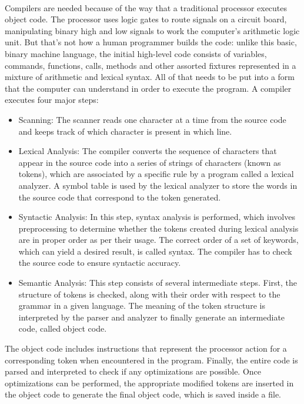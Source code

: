 \documentclass[12pt]{article}
\begin{document}
\\
Compilers are needed because of the way that a traditional processor executes object code. The processor uses logic gates to route signals on a circuit board, manipulating binary high and low signals to work the computer’s arithmetic logic unit. But that’s not how a human programmer builds the code: unlike this basic, binary machine language, the initial high-level code consists of variables, commands, functions, calls, methods and other assorted fixtures represented in a mixture of arithmetic and lexical syntax. All of that needs to be put into a form that the computer can understand in order to execute the program.
A compiler executes four major steps:
\\
\begin{itemize}
\item Scanning: The scanner reads one character at a time from the source code and keeps track of which character is present in which line.

\item Lexical Analysis: The compiler converts the sequence of characters that appear in the source code into a series of strings of characters (known as tokens), which are associated by a specific rule by a program called a lexical analyzer. A symbol table is used by the lexical analyzer to store the words in the source code that correspond to the token generated.

\item Syntactic Analysis: In this step, syntax analysis is performed, which involves preprocessing to determine whether the tokens created during lexical analysis are in proper order as per their usage. The correct order of a set of keywords, which can yield a desired result, is called syntax. The compiler has to check the source code to ensure syntactic accuracy.

\item Semantic Analysis: This step consists of several intermediate steps. First, the structure of tokens is checked, along with their order with respect to the grammar in a given language. The meaning of the token structure is interpreted by the parser and analyzer to finally generate an intermediate code, called object code.
\end{itemize}
The object code includes instructions that represent the processor action for a corresponding token when encountered in the program. Finally, the entire code is parsed and interpreted to check if any optimizations are possible. Once optimizations can be performed, the appropriate modified tokens are inserted in the object code to generate the final object code, which is saved inside a file.
\end{document}
